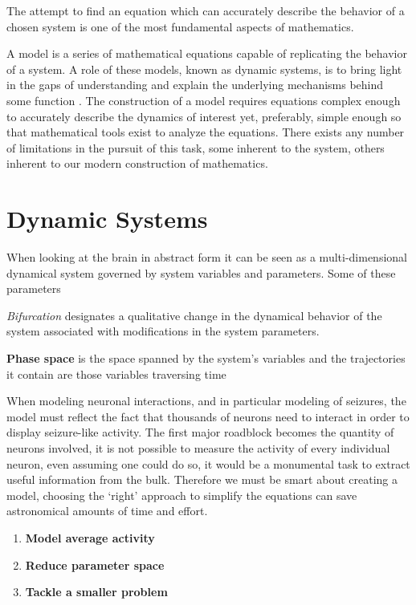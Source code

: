 \documentclass[../../Orator.tex]{subfiles}
\begin{document}
The attempt to find an equation which can accurately describe the behavior of a chosen system is one of the most fundamental aspects of mathematics.

A model is a series of mathematical equations capable of replicating the behavior of a system. A role of these models, known as dynamic systems, is to bring light in the gaps of understanding and explain the underlying mechanisms behind some function \citelater. 
The construction of a model requires equations complex enough to accurately describe the dynamics of interest yet, preferably, simple enough so that mathematical tools exist to analyze the equations\footnotemark. 
There exists any number of limitations in the pursuit of this task, some inherent to the system, others inherent to our modern construction of mathematics.

\section{Dynamic Systems}

When looking at the brain in abstract form it can be seen as a multi-dimensional dynamical system governed by system variables and parameters. Some of these parameters


\textit{Bifurcation} designates a qualitative change in the dynamical behavior of the system associated with modifications in the system parameters.


\textbf{Phase space} is the space spanned by the system's variables and the trajectories it contain are those variables traversing time




When modeling neuronal interactions, and in particular modeling of seizures, the model must reflect the fact that thousands of neurons need to interact in order to display seizure-like activity. 
The first major roadblock becomes the quantity of neurons involved, it is not possible to measure the activity of every individual neuron, even assuming one could do so, it would be a monumental task to extract useful information from the bulk. 
Therefore we must be smart about creating a model, choosing the `right' approach to simplify the equations can save astronomical amounts of time and effort.
\begin{enumerate}
    \item \textbf{Model average activity}
    \item \textbf{Reduce parameter space}
    \item \textbf{Tackle a smaller problem}
\end{enumerate}
\end{document}

